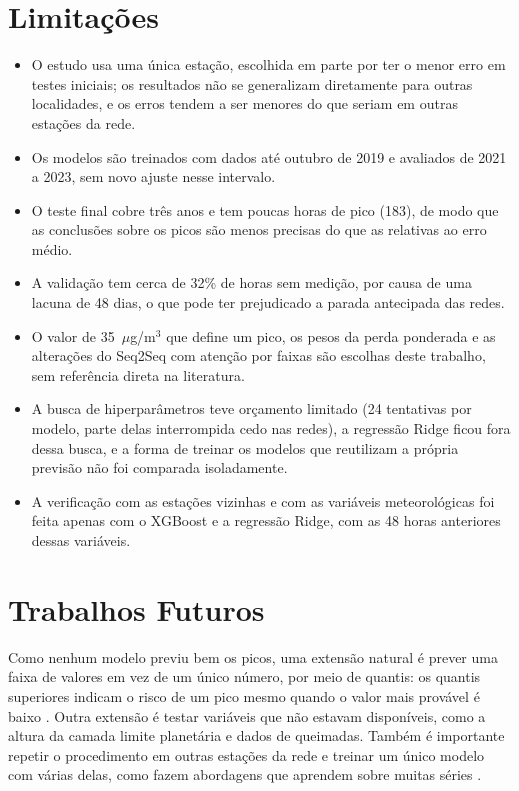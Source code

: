 \section{Limitações}

\begin{itemize}
    \item O estudo usa uma única estação, escolhida em parte por ter o menor erro em testes iniciais; os resultados não se generalizam diretamente para outras localidades, e os erros tendem a ser menores do que seriam em outras estações da rede.
    \item Os modelos são treinados com dados até outubro de 2019 e avaliados de 2021 a 2023, sem novo ajuste nesse intervalo.
    \item O teste final cobre três anos e tem poucas horas de pico (183), de modo que as conclusões sobre os picos são menos precisas do que as relativas ao erro médio.
    \item A validação tem cerca de 32\% de horas sem medição, por causa de uma lacuna de 48 dias, o que pode ter prejudicado a parada antecipada das redes.
    \item O valor de 35~\(\mu\)g/m\(^3\) que define um pico, os pesos da perda ponderada e as alterações do Seq2Seq com atenção por faixas são escolhas deste trabalho, sem referência direta na literatura.
    \item A busca de hiperparâmetros teve orçamento limitado (24 tentativas por modelo, parte delas interrompida cedo nas redes), a regressão Ridge ficou fora dessa busca, e a forma de treinar os modelos que reutilizam a própria previsão não foi comparada isoladamente.
    \item A verificação com as estações vizinhas e com as variáveis meteorológicas foi feita apenas com o XGBoost e a regressão Ridge, com as 48 horas anteriores dessas variáveis.
\end{itemize}

\section{Trabalhos Futuros}

Como nenhum modelo previu bem os picos, uma extensão natural é prever uma faixa de valores em vez de um único número, por meio de quantis: os quantis superiores indicam o risco de um pico mesmo quando o valor mais provável é baixo \cite{wen2017mqrnn,koenker1978regression}. Outra extensão é testar variáveis que não estavam disponíveis, como a altura da camada limite planetária e dados de queimadas. Também é importante repetir o procedimento em outras estações da rede e treinar um único modelo com várias delas, como fazem abordagens que aprendem sobre muitas séries \cite{salinas2020deepar}.
